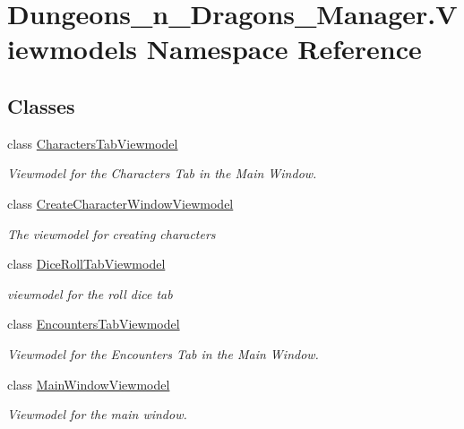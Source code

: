 \hypertarget{namespace_dungeons__n___dragons___manager_1_1_viewmodels}{}\section{Dungeons\+\_\+n\+\_\+\+Dragons\+\_\+\+Manager.\+Viewmodels Namespace Reference}
\label{namespace_dungeons__n___dragons___manager_1_1_viewmodels}
\subsection*{Classes}
\begin{DoxyCompactItemize}
\item 
class \mbox{\hyperlink{class_dungeons__n___dragons___manager_1_1_viewmodels_1_1_characters_tab_viewmodel}{Characters\+Tab\+Viewmodel}}
\begin{DoxyCompactList}\small\item\em Viewmodel for the Characters Tab in the Main Window. \end{DoxyCompactList}\item 
class \mbox{\hyperlink{class_dungeons__n___dragons___manager_1_1_viewmodels_1_1_create_character_window_viewmodel}{Create\+Character\+Window\+Viewmodel}}
\begin{DoxyCompactList}\small\item\em The viewmodel for creating characters \end{DoxyCompactList}\item 
class \mbox{\hyperlink{class_dungeons__n___dragons___manager_1_1_viewmodels_1_1_dice_roll_tab_viewmodel}{Dice\+Roll\+Tab\+Viewmodel}}
\begin{DoxyCompactList}\small\item\em viewmodel for the roll dice tab \end{DoxyCompactList}\item 
class \mbox{\hyperlink{class_dungeons__n___dragons___manager_1_1_viewmodels_1_1_encounters_tab_viewmodel}{Encounters\+Tab\+Viewmodel}}
\begin{DoxyCompactList}\small\item\em Viewmodel for the Encounters Tab in the Main Window. \end{DoxyCompactList}\item 
class \mbox{\hyperlink{class_dungeons__n___dragons___manager_1_1_viewmodels_1_1_main_window_viewmodel}{Main\+Window\+Viewmodel}}
\begin{DoxyCompactList}\small\item\em Viewmodel for the main window. \end{DoxyCompactList}\end{DoxyCompactItemize}
